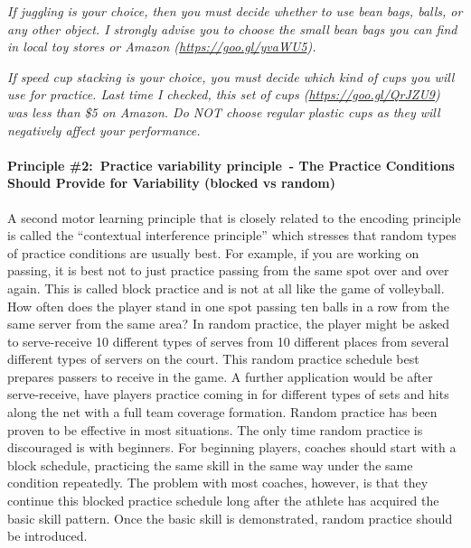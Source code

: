 \documentclass[
  letterpaper,
  DIV=11,
  numbers=noendperiod]{scrartcl}
\let\oldparagraph\paragraph
\renewcommand{\paragraph}[1]{\oldparagraph{#1}\mbox{}}
\begin{document}
\emph{If juggling is your choice, then you must decide whether to use
bean bags, balls, or any other object. I strongly advise you to choose
the small bean bags you can find in local toy stores or Amazon
(\url{https://goo.gl/yvaWU5}).}

\emph{If speed cup stacking is your choice, you must decide which kind
of cups you will use for practice. Last time I checked, this set of cups
(\url{https://goo.gl/QrJZU9}) was less than \$5 on Amazon. Do NOT choose
regular plastic cups as they will negatively affect your performance.}

\hypertarget{principle-2-practice-variability-principle---the-practice-conditions-should-provide-for-variability-blocked-vs-random}{%
\paragraph{\texorpdfstring{\textbf{Principle \#2:~Practice variability
principle~- The Practice Conditions Should Provide for Variability
(blocked vs
random)}}{Principle \#2:~Practice variability principle~- The Practice Conditions Should Provide for Variability (blocked vs random)}}\label{principle-2-practice-variability-principle---the-practice-conditions-should-provide-for-variability-blocked-vs-random}}

A second motor learning principle that is closely related to the
encoding principle is called the ``contextual interference principle''
which stresses that random types of practice conditions are usually
best. For example, if you are working on passing, it is best not to just
practice passing from the same spot over and over again. This is called
block practice and is not at all like the game of volleyball. How often
does the player stand in one spot passing ten balls in a row from the
same server from the same area? In random practice, the player might be
asked to serve-receive 10 different types of serves from 10 different
places from several different types of servers on the court. This random
practice schedule best prepares passers to receive in the game. A
further application would be after serve-receive, have players practice
coming in for different types of sets and hits along the net with a full
team coverage formation. Random practice has been proven to be effective
in most situations. The only time random practice is discouraged is with
beginners. For beginning players, coaches should start with a block
schedule, practicing the same skill in the same way under the same
condition repeatedly. The problem with most coaches, however, is that
they continue this blocked practice schedule long after the athlete has
acquired the basic skill pattern. Once the basic skill is demonstrated,
random practice should be introduced.
\end{document}
